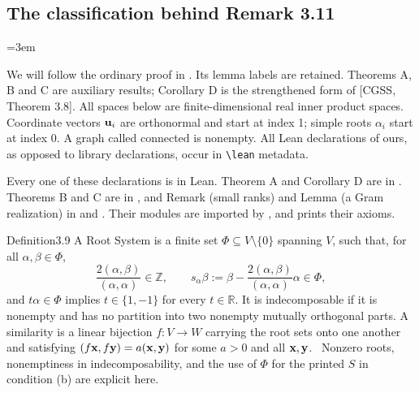 \subsection{The classification behind Remark 3.11}\label{sec:rem311}
\begingroup
\emergencystretch=3em
\newcommand{\rsq}[1]{(#1,#1)}
\newcommand{\Cyc}{\operatorname{Cyc}}

We will follow the ordinary proof in .
Its lemma labels are retained. Theorems A, B and C are auxiliary results;
Corollary D is the strengthened form of [CGSS, Theorem 3.8].
All spaces below are finite-dimensional real inner product spaces.
Coordinate vectors ${\mathbf u}_i$ are orthonormal and start at index 1;
simple roots $\alpha_i$ start at index 0. A graph called connected is nonempty.
All Lean declarations of ours, as opposed to library declarations, occur in
\verb|\lean| metadata.

\begingroup\raggedright
Every one of these declarations is in Lean. Theorem A and Corollary D
are in . Theorems B and C are in
, and Remark (small ranks) and
Lemma (a Gram realization) in  and
. Their
modules are imported by , and
 prints their axioms.\par
\endgroup

\begin{cgss}{Definition}{3.9}\label{def:roots}\label{def:3.9}
A Root System is a finite set $\Phi\subseteq V\setminus\{0\}$ spanning $V$,
such that, for all $\alpha,\beta\in\Phi$,
\[
 \frac{2(\alpha,\beta)}{\rsq\alpha}\in\mathbb Z,
 \qquad s_\alpha\beta:=\beta-
       \frac{2(\alpha,\beta)}{\rsq\alpha}\alpha\in\Phi,
\]
and $t\alpha\in\Phi$ implies $t\in\{1,-1\}$ for every $t\in\mathbb R$.
It is indecomposable if it is nonempty and has no partition into two
nonempty mutually orthogonal parts. A similarity is a linear bijection
$f:V\to W$ carrying the root sets onto one another and satisfying
$(f{\mathbf x},f{\mathbf y})=a({\mathbf x},{\mathbf y})$ for some $a>0$ and all ${\mathbf x},{\mathbf y}$.
\repair\ Nonzero roots, nonemptiness in indecomposability, and the use of
$\Phi$ for the printed $S$ in condition (b) are explicit here.
\end{cgss}

